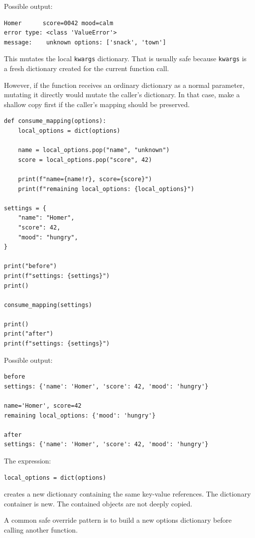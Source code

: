 Possible output:

\begin{verbatim}
Homer      score=0042 mood=calm
error type: <class 'ValueError'>
message:    unknown options: ['snack', 'town']
\end{verbatim}

This mutates the local \texttt{kwargs} dictionary. That is usually safe because \texttt{kwargs} is a fresh dictionary created for the current function call.

However, if the function receives an ordinary dictionary as a normal parameter, mutating it directly would mutate the caller's dictionary. In that case, make a shallow copy first if the caller's mapping should be preserved.

\begin{verbatim}
def consume_mapping(options):
    local_options = dict(options)

    name = local_options.pop("name", "unknown")
    score = local_options.pop("score", 42)

    print(f"name={name!r}, score={score}")
    print(f"remaining local_options: {local_options}")

settings = {
    "name": "Homer",
    "score": 42,
    "mood": "hungry",
}

print("before")
print(f"settings: {settings}")
print()

consume_mapping(settings)

print()
print("after")
print(f"settings: {settings}")
\end{verbatim}

Possible output:

\begin{verbatim}
before
settings: {'name': 'Homer', 'score': 42, 'mood': 'hungry'}

name='Homer', score=42
remaining local_options: {'mood': 'hungry'}

after
settings: {'name': 'Homer', 'score': 42, 'mood': 'hungry'}
\end{verbatim}

The expression:

\begin{verbatim}
local_options = dict(options)
\end{verbatim}

creates a new dictionary containing the same key-value references. The dictionary container is new. The contained objects are not deeply copied.

A common safe override pattern is to build a new options dictionary before calling another function.

